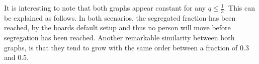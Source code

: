 It is interesting to note that both graphs appear constant for any \(q\leq \frac{1}{3}\). 
This can be explained as follows. In both scenarios, the segregated fraction has been reached, by the boards default setup and thus no person will move before segregation has been reached.
Another remarkable similarity between both graphs, is that they tend to grow with the same order between a fraction of 0.3 and 0.5.
